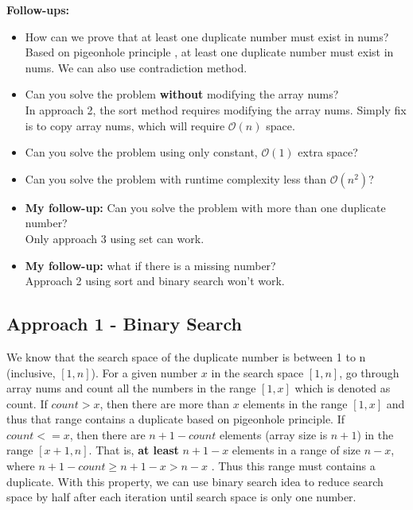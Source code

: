 \documentclass[justified]{tufte-book}
\begin{document}
\noindent \textbf{Follow-ups:}
\begin{itemize}
    \item How can we prove that at least one duplicate number must exist in nums?\\
    Based on pigeonhole principle , at least one duplicate number must exist in nums. We can also use contradiction method. 
    \item Can you solve the problem \textbf{without} modifying the array nums? \\
    In approach 2, the sort method requires modifying the array nums. Simply fix is to copy array nums, which will require $\mathcal{O}(n)$ space. 
    \item Can you solve the problem using only constant, $\mathcal{O}(1)$ extra space?
    \item Can you solve the problem with runtime complexity less than $\mathcal{O}(n^2)$?
    \item \textbf{My follow-up:} Can you solve the problem with more than one duplicate number? \\
    Only approach 3 using set can work. 
    \item \textbf{My follow-up:} what if there is a missing number? \\
    Approach 2 using sort and binary search won't work.
\end{itemize}

\subsection{Approach 1 - Binary Search}
We know that the search space of the duplicate number is between 1 to n (inclusive, $[1, n]$). For a given number $x$ in the search space $[1, n]$, go through array nums and count all the numbers in the range $[1, x]$ which is denoted as count. If $count > x$, then there are more than $x$ elements in the range $[1, x]$ and thus that range contains a duplicate based on pigeonhole principle. If $count <= x$, then there are $n + 1 - count$ elements (array size is $n+1$) in the range $[x+1, n]$. That is, \textbf{at least} $n + 1 - x$ elements in a range of size $n - x$, where $n + 1 - count \geq n + 1 - x > n - x$ . Thus this range must contains a duplicate.  With this property, we can use binary search idea to reduce search space by half after each iteration until search space is only one number.  
\end{document}
